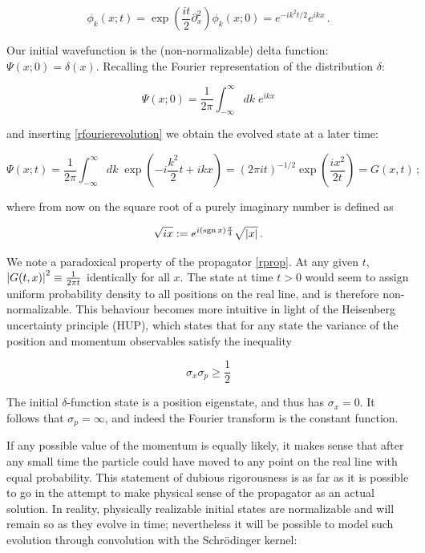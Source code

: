 \documentclass{article}
\begin{document}
\begin{equation}
    \label{rfourierevolution}
    \phi_k(x; t) = \exp(\frac{it}{2}\partial_x^2) \phi_k(x;0) = e^{-ik^{2}t/2} e^{ikx}\,.
\end{equation}

Our initial wavefunction is the (non-normalizable) delta function: $\Psi(x;0) = \delta(x)$. Recalling the Fourier representation of the distribution $\delta$:

\begin{equation}
    \Psi(x;0) = \frac{1}{2\pi} \int_{-\infty}^\infty dk \; e^{ikx} 
\end{equation}

and inserting \eqref{rfourierevolution} we obtain the evolved state at a later time:

\begin{equation}\label{rprop}
    \Psi(x;t) = \frac{1}{2\pi} \int_{-\infty}^{\infty} dk \; \exp( - i \frac{k^2}{2}t +  ikx ) = (2 \pi i t)^{-1/2} \exp(\frac{ix^2}{2t}) = G(x,t)\,;
\end{equation}

where from now on the square root of a purely imaginary number is defined as

\begin{equation}
    \sqrt{ix} := e^{i(\operatorname{sgn} x) \frac{\pi}{4}} \sqrt{\abs{x}}\,.
\end{equation}

We note a paradoxical property of the propagator \eqref{rprop}. At any given $t$, $\abs{G(t,x)}^2 \equiv \frac{1}{2\pi t}$ identically for all $x$. The state at time $t>0$ would seem to assign uniform probability density to all positions on the real line, and is therefore non-normalizable. This behaviour becomes more intuitive in light of the Heisenberg uncertainty principle (HUP), which states that for any state the variance of the position and momentum observables satisfy the inequality

\begin{equation}
    \sigma_x \sigma_p \geq \frac{1}{2}
\end{equation}

The initial $\delta$-function state is a position eigenstate, and thus has $\sigma_x = 0$. It follows that $\sigma_p = \infty$, and indeed the Fourier transform is the constant function.

If any possible value of the momentum is equally likely, it makes sense that after any small time the particle could have moved to any point on the real line with equal probability. This statement of dubious rigorousness is as far as it is possible to go in the attempt to make physical sense of the propagator as an actual solution. In reality, physically realizable initial states are normalizable and will remain so as they evolve in time; nevertheless it will be possible to model such evolution through convolution with the Schr\"odinger kernel:
\end{document}
